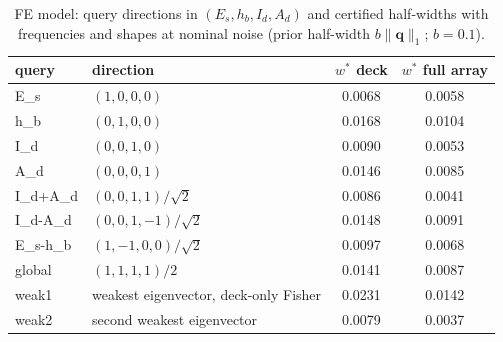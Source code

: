 \begin{table}[h]\centering\footnotesize
\caption{FE model: query directions in $(E_s,h_b,I_d,A_d)$ and certified half-widths with frequencies and shapes at nominal noise (prior half-width $b\|\mathbf{q}\|_1$; $b=0.1$).}\label{tab:s7}
\begin{tabular}{llcc}\toprule query & direction & $w^{*}$ deck & $w^{*}$ full array\\ \midrule
E\_s & $(1,0,0,0)$ & 0.0068 & 0.0058 \\
h\_b & $(0,1,0,0)$ & 0.0168 & 0.0104 \\
I\_d & $(0,0,1,0)$ & 0.0090 & 0.0053 \\
A\_d & $(0,0,0,1)$ & 0.0146 & 0.0085 \\
I\_d+A\_d & $(0,0,1,1)/\sqrt{2}$ & 0.0086 & 0.0041 \\
I\_d-A\_d & $(0,0,1,-1)/\sqrt{2}$ & 0.0148 & 0.0091 \\
E\_s-h\_b & $(1,-1,0,0)/\sqrt{2}$ & 0.0097 & 0.0068 \\
global & $(1,1,1,1)/2$ & 0.0141 & 0.0087 \\
weak1 & weakest eigenvector, deck-only Fisher & 0.0231 & 0.0142 \\
weak2 & second weakest eigenvector & 0.0079 & 0.0037 \\
\bottomrule\end{tabular}\end{table}